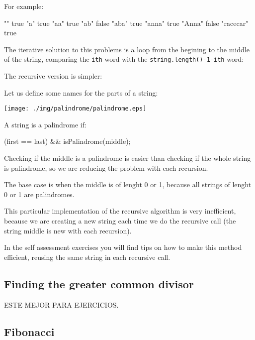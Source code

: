 \documentclass[a4paper, 9pt]{extarticle}
\begin{document}
For example:

\begin{blackboard}
"" true
"a" true
"aa" true
"ab" false
"aba" true
"anna" true
"Anna" false
"racecar" true
\end{blackboard}

The iterative solution to this problems is a loop from the begining to the
middle of the string, comparing the \texttt{ith} word with the
\texttt{string.length()-1-ith} word:


The recursive version is simpler:

Let us define some names for the parts of a string:

\begin{center}
\texttt{[image: ./img/palindrome/palindrome.eps]}
\end{center}

A string is a palindrome if:

\begin{blackboard}
  (first == last) && isPalindrome(middle);
\end{blackboard}

Checking if the middle is a palindrome is easier than checking if the whole
string is palindrome, so we are reducing the problem with each recursion.

The base case is when the middle is of lenght 0 or 1, because all strings of
lenght 0 or 1 are palindromes.



This particular implementation of the recursive algorithm is very inefficient,
because we are creating a new string each time we do the recursive call (the
string middle is new with each recursion).

In the self assessment exercises you will find tips on how to make this method
efficient, reusing the same string in each recursive call.


\subsection{Finding the greater common divisor}

ESTE MEJOR PARA EJERCICIOS.


\subsection{Fibonacci}
\end{document}
